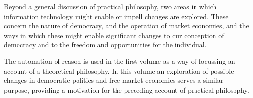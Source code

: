 Beyond a general discussion of practical philosophy, two areas in which information technology might enable or impell changes are explored.
These concern the nature of democracy, and the operation of market economies, and the ways in which these might enable significant changes to our conception of democracy and to the freedom and opportunities for the individual.

The automation of reason is used in the first volume as a way of focussing an account of a theoretical philosophy.
In this volume an exploration of possible changes in democratic politics and free market economies serves a similar purpose, providing a motivation for the preceding account of practical philosophy.

